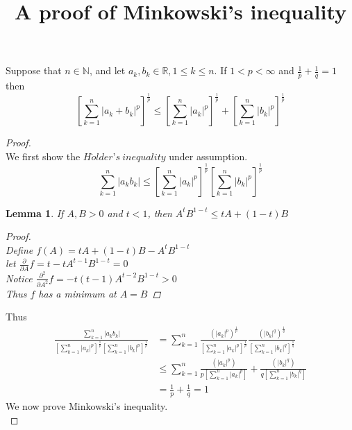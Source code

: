 \documentclass{article}
\newtheorem{lemma}{Lemma}
\begin{document}
	\title{A proof of Minkowski’s inequality}
	\maketitle
\begin{flushleft}
	Suppose that $n \in\mathbb{N}$, and let $a_{k}, b_{k} \in\mathbb{R}, 1\leq k\leq n$. If $1<p<\infty$ and $\frac{1}{p}+\frac{1}{q}=1$ then\[\left[\sum_{k=1}^{n} \left|a_{k}+b_{k}\right|^{p}\right]^{\frac{1}{p}}\leq \left[\sum_{k=1}^{n} \left|a_{k}\right|^{p}\right]^{\frac{1}{p}}+\left[\sum_{k=1}^{n} \left|b_{k}\right|^{p}\right]^{\frac{1}{p}}\]
\end{flushleft}
\begin{proof}
	~\\
	\linespread{1.5}
	We first show the $H\ddot{o}lder’s\ inequality$ under assumption.
	\[\sum_{k=1}^{n}\left|a_{k}b_{k}\right| \leq \left[\sum_{k=1}^{n} \left|a_{k}\right|^{p}\right]^{\frac{1}{p}}\left[\sum_{k=1}^{n} \left|b_{k}\right|^{p}\right]^{\frac{1}{p}}\]
	\begin{lemma}
		If $A,B>0$ and $t<1$, then $A^{t}B^{1-t}\leq tA+(1-t)B$
		\begin{proof}
			~\\
			Define $f(A)=tA+(1-t)B-A^{t}B^{1-t}$\\
			let $\frac{\partial}{\partial A}f=t-tA^{t-1}B^{1-t}=0$\\
			Notice $\frac{\partial ^{2}}{\partial A^{2}}f=-t(t-1)A^{t-2}B^{1-t}>0$\\
			Thus $f$ has a minimum at $A=B$
		\end{proof}
	\end{lemma}
	Thus\\
	\begin{align*}
		\frac{\sum_{k=1}^{n}\left|a_{k}b_{k}\right|}{\left[\sum_{k=1}^{n} \left|a_{k}\right|^{p}\right]^{\frac{1}{p}}\left[\sum_{k=1}^{n} \left|b_{k}\right|^{p}\right]^{\frac{1}{p}}} 
		    &= \sum_{k=1}^{n} \frac{(\left|a_{k}\right|^{p})^{\frac{1}{p}}}{\left[\sum_{k=1}^{n} \left|a_{k}\right|^{p}\right]^{\frac{1}{p}}}\frac{(\left|b_{k}\right|^{q})^{\frac{1}{q}}}{\left[\sum_{k=1}^{n} \left|b_{k}\right|^{q}\right]^{\frac{1}{q}}}\\
			&\leq  \sum_{k=1}^{n} \frac{(\left|a_{k}\right|^{p})}{p\left[\sum_{k=1}^{n} \left|a_{k}\right|^{p}\right]}+\frac{(\left|b_{k}\right|^{q})}{q\left[\sum_{k=1}^{n} \left|b_{k}\right|^{q}\right]} \\
		    &=\frac{1}{p}+\frac{1}{q}=1
	\end{align*}
	We now prove Minkowski’s inequality.\\

\end{proof}
\end{document}
